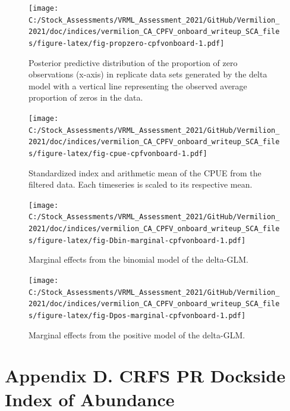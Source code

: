 \documentclass[11pt,
  english,
]{article}
\begin{document}
\begin{figure}
\centering
\texttt{[image: C:/Stock\_Assessments/VRML\_Assessment\_2021/GitHub/Vermilion\_2021/doc/indices/vermilion\_CA\_CPFV\_onboard\_writeup\_SCA\_files/figure-latex/fig-propzero-cpfvonboard-1.pdf]}
\caption{\label{fig:fig-propzero-cpfvonboard}Posterior predictive distribution of the proportion of zero observations (x-axis) in replicate data sets generated by the delta model with a vertical line representing the observed average proportion of zeros in the data.}
\end{figure}

\FloatBarrier

\begin{figure}
\centering
\texttt{[image: C:/Stock\_Assessments/VRML\_Assessment\_2021/GitHub/Vermilion\_2021/doc/indices/vermilion\_CA\_CPFV\_onboard\_writeup\_SCA\_files/figure-latex/fig-cpue-cpfvonboard-1.pdf]}
\caption{\label{fig:fig-cpue-cpfvonboard}Standardized index and arithmetic mean of the CPUE from the filtered data. Each timeseries is scaled to its respective mean.}
\end{figure}

\begin{figure}
\centering
\texttt{[image: C:/Stock\_Assessments/VRML\_Assessment\_2021/GitHub/Vermilion\_2021/doc/indices/vermilion\_CA\_CPFV\_onboard\_writeup\_SCA\_files/figure-latex/fig-Dbin-marginal-cpfvonboard-1.pdf]}
\caption{\label{fig:fig-Dbin-marginal-cpfvonboard}Marginal effects from the binomial model of the delta-GLM.}
\end{figure}

\begin{figure}
\centering
\texttt{[image: C:/Stock\_Assessments/VRML\_Assessment\_2021/GitHub/Vermilion\_2021/doc/indices/vermilion\_CA\_CPFV\_onboard\_writeup\_SCA\_files/figure-latex/fig-Dpos-marginal-cpfvonboard-1.pdf]}
\caption{\label{fig:fig-Dpos-marginal-cpfvonboard}Marginal effects from the positive model of the delta-GLM.}
\end{figure}

\clearpage


\hypertarget{appendix-d.-crfs-pr-dockside-index-of-abundance}{%
\section*{Appendix D. CRFS PR Dockside Index of Abundance}\label{appendix-d.-crfs-pr-dockside-index-of-abundance}}
\end{document}
